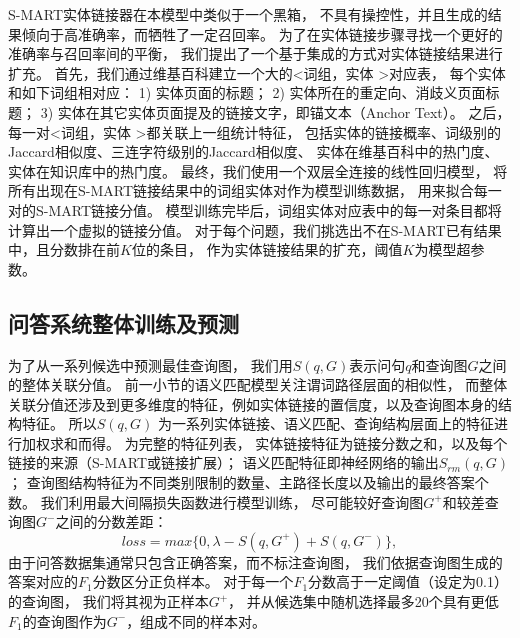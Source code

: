 S-MART实体链接器\cite{yang2015s}在本模型中类似于一个黑箱，
不具有操控性，并且生成的结果倾向于高准确率，而牺牲了一定召回率。
为了在实体链接步骤寻找一个更好的准确率与召回率间的平衡，
我们提出了一个基于集成的方式对实体链接结果进行扩充。
首先，我们通过维基百科建立一个大的\textless 词组，实体 \textgreater 对应表，
每个实体和如下词组相对应：
1) 实体页面的标题；
2) 实体所在的重定向、消歧义页面标题；
3) 实体在其它实体页面提及的链接文字，即锚文本（Anchor Text）。
之后，每一对\textless 词组，实体 \textgreater 都关联上一组统计特征，
包括实体的链接概率、词级别的Jaccard相似度、三连字符级别的Jaccard相似度、%
实体在维基百科中的热门度、实体在知识库中的热门度。
最终，我们使用一个双层全连接的线性回归模型，
将所有出现在S-MART链接结果中的词组实体对作为模型训练数据，
用来拟合每一对的S-MART链接分值。
模型训练完毕后，词组实体对应表中的每一对条目都将计算出一个虚拟的链接分值。
对于每个问题，我们挑选出不在S-MART已有结果中，且分数排在前$K$位的条目，
作为实体链接结果的扩充，阈值$K$为模型超参数。


\subsection{问答系统整体训练及预测}
\label{sec:compqa-train}

为了从一系列候选中预测最佳查询图，
我们用$S(q, G)$表示问句$q$和查询图$G$之间的整体关联分值。
前一小节的语义匹配模型关注谓词路径层面的相似性，
而整体关联分值还涉及到更多维度的特征，例如实体链接的置信度，以及查询图本身的结构特征。
所以$S(q, G)$ 为一系列实体链接、语义匹配、查询结构层面上的特征进行加权求和而得。
为完整的特征列表，
实体链接特征为链接分数之和，以及每个链接的来源（S-MART或链接扩展）；
语义匹配特征即神经网络的输出$S_{rm}(q, G)$；
查询图结构特征为不同类别限制的数量、主路径长度以及输出的最终答案个数。
我们利用最大间隔损失函数进行模型训练，
尽可能较好查询图$G^+$和较差查询图$G^-$之间的分数差距：
\begin{equation}
\label{eqn:maxpool}
loss = max\{0, \lambda - S(q, G^+) + S(q, G^-)\},
\end{equation}
由于问答数据集通常只包含正确答案，而不标注查询图，
我们依据查询图生成的答案对应的$F_1$分数区分正负样本。
对于每一个$F_1$分数高于一定阈值（设定为0.1）的查询图，
我们将其视为正样本$G^+$，
并从候选集中随机选择最多20个具有更低$F_1$的查询图作为$G^-$，组成不同的样本对。


